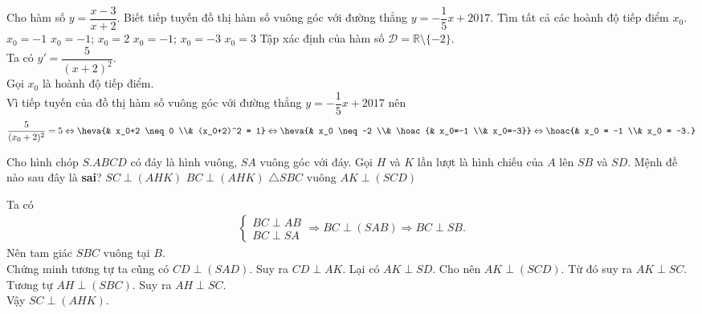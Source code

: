 \begin{ex}%
 Cho hàm số $y=\dfrac{x-3}{x+2}$. Biết tiếp tuyến đồ thị hàm số vuông góc với đường thẳng $y=-\dfrac{1}{5}x+2017$. Tìm tất cả các hoành độ tiếp điểm $x_0$.
 \choice
  {$x_0=-1$}
  {$x_0=-1$; $x_0=2$}
  {\True $x_0=-1$; $x_0=-3$}
  {$x_0=3$}
 \loigiai
  {
  Tập xác định của hàm số $\mathscr{D} = \mathbb{R}\setminus\{-2\}$.\\
  Ta có $y' = \dfrac{5}{(x+2)^2}$.\\
  Gọi $x_0$ là hoành độ tiếp điểm.\\
  Vì tiếp tuyến của đồ thị hàm số vuông góc với đường thẳng $y=-\dfrac{1}{5}x+2017$ nên
  \begin{align*}
   \dfrac{5}{(x_0+2)^2} = 5 \Leftrightarrow\heva{& x_0+2 \neq 0 \\& (x_0+2)^2 = 1} \Leftrightarrow \heva{& x_0 \neq -2 \\& \hoac{& x_0=-1 \\& x_0=-3}} \Leftrightarrow \hoac{& x_0 = -1 \\& x_0 = -3.}
  \end{align*}
  }
\end{ex}

\begin{ex}%
 Cho hình chóp $S.ABCD$ có đáy là hình vuông, $SA$ vuông góc với đáy. Gọi $H$ và $K$ lần lượt là hình chiếu của $A$ lên $SB$ và $SD$. Mệnh đề nào sau đây là \textbf{sai}?
 \choice
  {$SC \perp (AHK)$}
  {\True $BC \perp (AHK)$}
  {$\triangle SBC$ vuông}
  {$AK \perp (SCD)$}
 \loigiai
  {
  \immini
  {
  Ta có
  \begin{align*}
   \begin{cases} BC \perp AB \\ BC \perp SA \end{cases} \Rightarrow BC \perp (SAB) \Rightarrow BC \perp SB.
  \end{align*}
  Nên tam giác $SBC$ vuông tại $B$.\\
  Chứng minh tương tự ta cũng có $CD \perp (SAD)$. Suy ra $CD \perp AK$. Lại có $AK \perp SD$. Cho nên $AK \perp (SCD)$. Từ đó suy ra $AK \perp SC$.\\
  Tương tự $AH \perp (SBC)$. Suy ra $AH \perp SC$.\\
  Vậy $SC \perp (AHK)$.
  }
  {
  }
  }
\end{ex}

